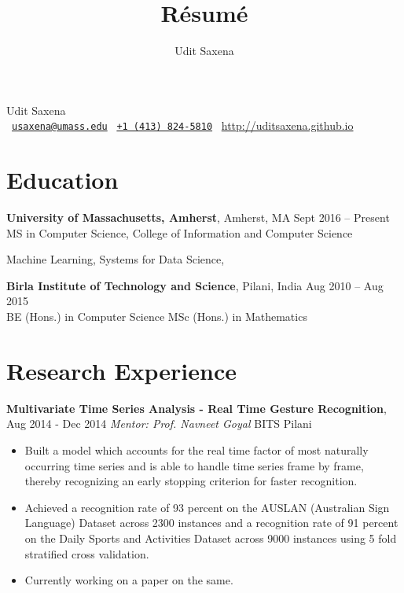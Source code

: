 \documentclass[letterpaper]{article}
\title{R\'esum\'e}
\author{Udit Saxena}
\begin{document}
\pagecolor{white}
\begin{center}
\huge
Udit Saxena\\
\small
\faEnvelope~\href{mailto:usaxena@umass.edu}{\nolinkurl{usaxena@umass.edu}}
\faPhone~\href{tel:14138245810}{\texttt{+1 (413) 824-5810}}
\faGlobe~\url{http://uditsaxena.github.io}
\normalsize
\end{center}

\section*{Education}
\vspace{-1mm}
\textbf{University of Massachusetts, Amherst}, Amherst, MA \hfill Sept 2016 --
    Present\\
MS in Computer Science, College of Information and Computer Science
\vspace{-2mm}
\begin{description}[leftmargin=!, labelwidth=\widthof{Coursework },
        font=\normalfont]
    \item[Coursework:] Machine Learning,
                        Systems for Data Science,
\end{description}
\vspace{-0.5mm}
\textbf{Birla Institute of Technology and Science}, Pilani, India \hfill
    Aug 2010 -- Aug 2015\\
BE (Hons.) in Computer Science
MSc (Hons.) in Mathematics

\section*{Research Experience}
\textbf{Multivariate Time Series Analysis - Real Time Gesture Recognition}, \hfill
Aug 2014 - Dec 2014
\emph{Mentor: Prof. Navneet Goyal} \hfill
BITS Pilani\\
\vspace{-6mm}
\begin{itemize}
\item Built a model which accounts for the real time factor of most naturally occurring time series and is able to handle time series frame by frame, thereby recognizing an early stopping criterion for faster recognition. 
\vspace{-2mm}
\item Achieved a recognition rate of 93 percent on the AUSLAN (Australian Sign Language) Dataset across 2300 instances and a recognition rate of 91 percent on the Daily Sports and Activities Dataset across 9000 instances using 5 fold stratified cross validation.
\vspace{-2mm}
\item Currently working on a paper on the same.
\end{itemize}
\end{document}
